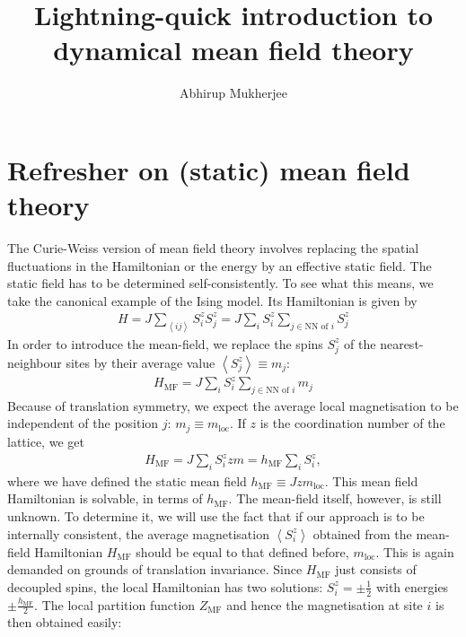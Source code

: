 \documentclass{article}
\begin{document}
\title{\bf Lightning-quick introduction to dynamical mean field theory}
\author{Abhirup Mukherjee}
\maketitle
{}

\section{Refresher on (static) mean field theory}
The Curie-Weiss version of mean field theory involves replacing the spatial fluctuations in the Hamiltonian or the energy by an effective static field. The static field has to be determined self-consistently. To see what this means, we take the canonical example of the Ising model. Its Hamiltonian is given by
\begin{equation}\begin{aligned}
	H = J\sum_{\left<ij \right>} S_i^z S_j^z = J\sum_i S_i^z \sum_{j \in \text{NN of }i}S_j^z
\end{aligned}\end{equation}
In order to introduce the mean-field, we replace the spins \(S_j^z\) of the nearest-neighbour sites by their average value \(\left<S_j^z\right> \equiv m_j\):
\begin{equation}\begin{aligned}
	H_\text{MF} = J\sum_i S_i^z \sum_{j \in \text{NN of }i}m_j
\end{aligned}\end{equation}
Because of translation symmetry, we expect the average local magnetisation to be independent of the position \(j\): \(m_j \equiv m_\text{loc}\). If \(z\) is the coordination number of the lattice, we get
\begin{equation}\begin{aligned}
	H_\text{MF} = J\sum_i S_i^z z m = h_\text{MF} \sum_i S_i^z,
\end{aligned}\end{equation}
where we have defined the static mean field \(h_\text{MF} \equiv Jzm_\text{loc}\). This mean field Hamiltonian is solvable, in terms of \(h_\text{MF}\). The mean-field itself, however, is still unknown. To determine it, we will use the fact that if our approach is to be internally consistent, the average magnetisation \(\left<S_i^z \right>\) obtained from the mean-field Hamiltonian \(H_\text{MF}\) should be equal to that defined before, \(m_\text{loc}\). This is again demanded on grounds of translation invariance. Since \(H_\text{MF}\) just consists of decoupled spins, the local Hamiltonian has two solutions: \(S_i^z = \pm \frac{1}{2}\) with energies \(\pm \frac{h_\text{MF}}{2}\). The local partition function \(Z_\text{MF}\) and hence the magnetisation at site \(i\) is then obtained easily:
\end{document}
